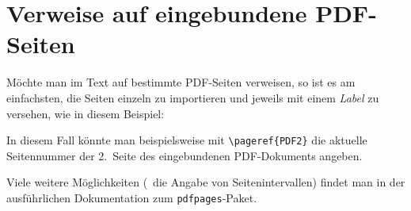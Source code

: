 \section{Verweise auf eingebundene PDF-Seiten}

Möchte man im Text auf bestimmte PDF-Seiten verweisen, so ist es am
einfachsten, die Seiten einzeln zu importieren und jeweils mit einem
\emph{Label} zu versehen, wie in diesem Beispiel:
%
\begin{LaTeXCode}[numbers=none]


\end{LaTeXCode}
%
In diesem Fall könnte man beispielsweise mit \verb!\pageref{PDF2}! die
aktuelle Seitennummer der 2.\ Seite des eingebundenen PDF-Dokuments angeben.

Viele weitere Möglichkeiten (\zB\ die Angabe von Seitenintervallen) findet man
in der ausführlichen Dokumentation zum \texttt{pdfpages}-Paket.





